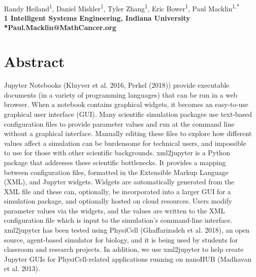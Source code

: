 \documentclass[10pt,letterpaper]{article}
\begin{document}
\vspace*{0.35in}

\begin{flushleft}
{\Large
\textbf{}
}
\newline
\\
Randy Heiland\textsuperscript{1},
Daniel Mishler\textsuperscript{1},
Tyler Zhang\textsuperscript{1},
Eric Bower\textsuperscript{1},
Paul Macklin\textsuperscript{1,*}
\\
\bigskip
\bf{1} Intelligent Systems Engineering, Indiana University
\bigskip
\\
*Paul.Macklin@MathCancer.org 

\end{flushleft}

\section*{Abstract}
Jupyter Notebooks (Kluyver et al. 2016, Perkel (2018)) provide
executable documents (in a variety of programming languages) that can be
run in a web browser. When a notebook contains graphical widgets, it
becomes an easy-to-use graphical user interface (GUI). Many scientific
simulation packages use text-based configuration files to provide
parameter values and run at the command line without a graphical
interface. Manually editing these files to explore how different values
affect a simulation can be burdensome for technical users, and
impossible to use for those with other scientific backgrounds.
xml2jupyter is a Python package that addresses these scientific
bottlenecks. It provides a mapping between configuration files,
formatted in the Extensible Markup Language (XML), and Jupyter widgets.
Widgets are automatically generated from the XML file and these can,
optionally, be incorporated into a larger GUI for a simulation package,
and optionally hosted on cloud resources. Users modify parameter values
via the widgets,
and the values are written to the XML configuration file which is input
to the simulation's command-line interface. xml2jupyter has been tested
using PhysiCell (Ghaffarizadeh et al. 2018), an open source, agent-based
simulator for biology, and it is being used by students for classroom
and research projects. In addition, we use xml2jupyter to help create
Jupyter GUIs for PhysiCell-related applications running on nanoHUB
(Madhavan et al. 2013).
\end{document}
